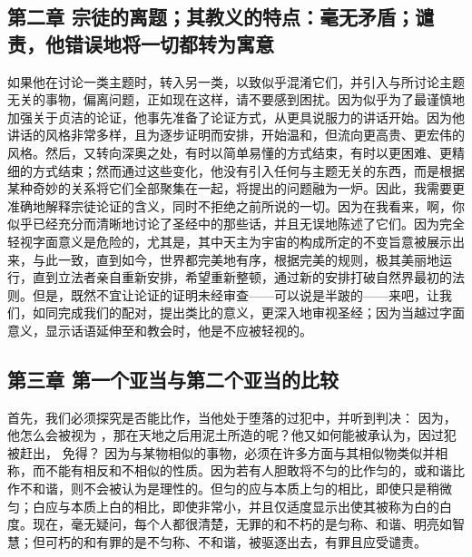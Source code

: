 \subsection{第二章 宗徒的离题；其教义的特点：毫无矛盾；谴责，他错误地将一切都转为寓意}

如果他在讨论一类主题时，转入另一类，以致似乎混淆它们，并引入与所讨论主题无关的事物，偏离问题，正如现在这样，请不要感到困扰。因为似乎为了最谨慎地加强关于贞洁的论证，他事先准备了论证方式，从更具说服力的讲话开始。因为他讲话的风格非常多样，且为逐步证明而安排，开始温和，但流向更高贵、更宏伟的风格。然后，又转向深奥之处，有时以简单易懂的方式结束，有时以更困难、更精细的方式结束；然而通过这些变化，他没有引入任何与主题无关的东西，而是根据某种奇妙的关系将它们全部聚集在一起，将提出的问题融为一炉。因此，我需要更准确地解释宗徒论证的含义，同时不拒绝之前所说的一切。因为在我看来，啊，你似乎已经充分而清晰地讨论了圣经中的那些话，并且无误地陈述了它们。因为完全轻视字面意义是危险的，尤其是，其中天主为宇宙的构成所定的不变旨意被展示出来，与此一致，直到如今，世界都完美地有序，根据完美的规则，极其美丽地运行，直到立法者亲自重新安排，希望重新整顿，通过新的安排打破自然界最初的法则。但是，既然不宜让论证的证明未经审查——可以说是半跛的——来吧，让我们，如同完成我们的配对，提出类比的意义，更深入地审视圣经；因为当越过字面意义，显示话语延伸至和教会时，他是不应被轻视的。\par


\subsection{第三章 第一个亚当与第二个亚当的比较}

首先，我们必须探究是否能比作，当他处于堕落的过犯中，并听到判决：  因为，他怎么会被视为 ，那在天地之后用泥土所造的呢？他又如何能被承认为，因过犯被赶出， 免得？ 因为与某物相似的事物，必须在许多方面与其相似物类似并相称，而不能有相反和不相似的性质。因为若有人胆敢将不匀的比作匀的，或和谐比作不和谐，则不会被认为是理性的。但匀的应与本质上匀的相比，即使只是稍微匀；白应与本质上白的相比，即使非常小，并且仅适度显示出使其被称为白的白度。现在，毫无疑问，每个人都很清楚，无罪的和不朽的是匀称、和谐、明亮如智慧；但可朽的和有罪的是不匀称、不和谐，被驱逐出去，有罪且应受谴责。\par

